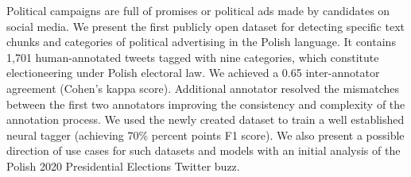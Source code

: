 Political campaigns are full of promises or political ads made by candidates on social media. We present the first publicly open dataset for detecting specific text chunks and categories of political advertising in the Polish language. It contains 1,701 human-annotated tweets tagged with nine categories, which constitute electioneering under Polish electoral law. We achieved a 0.65 inter-annotator agreement (Cohen's kappa score). Additional annotator resolved the mismatches between the first two annotators improving the consistency and complexity of the annotation process. We used the newly created dataset to train a well established neural tagger (achieving 70\% percent points F1 score). We also present a possible direction of use cases for such datasets and models with an initial analysis of the Polish 2020 Presidential Elections Twitter buzz.
